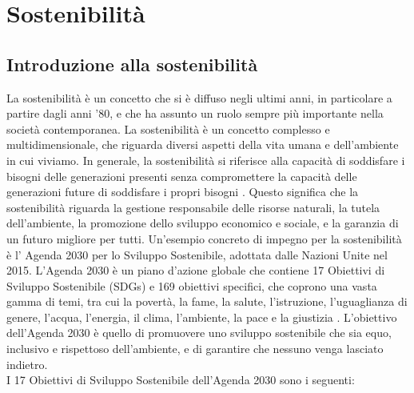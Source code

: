 \section{Sostenibilità}

\subsection{Introduzione alla sostenibilità}

La sostenibilità è un concetto che si è diffuso negli ultimi anni, in particolare a partire dagli anni '80, e che ha assunto un ruolo sempre più importante nella società contemporanea. La sostenibilità è un concetto complesso e multidimensionale, che riguarda diversi aspetti della vita umana e dell'ambiente in cui viviamo. In generale, la sostenibilità si riferisce alla capacità di soddisfare i bisogni delle generazioni presenti senza compromettere la capacità delle generazioni future di soddisfare i propri bisogni \cite{sostenibilità}. Questo significa che la sostenibilità riguarda la gestione responsabile delle risorse naturali, la tutela dell'ambiente, la promozione dello sviluppo economico e sociale, e la garanzia di un futuro migliore per tutti.
Un'esempio concreto di impegno per la sostenibilità è l' Agenda 2030 per lo Sviluppo Sostenibile, adottata dalle Nazioni Unite nel 2015. L'Agenda 2030 è un piano d'azione globale che contiene 17 Obiettivi di Sviluppo Sostenibile (SDGs) e 169 obiettivi specifici, che coprono una vasta gamma di temi, tra cui la povertà, la fame, la salute, l'istruzione, l'uguaglianza di genere, l'acqua, l'energia, il clima, l'ambiente, la pace e la giustizia \cite{2030}. L'obiettivo dell'Agenda 2030 è quello di promuovere uno sviluppo sostenibile che sia equo, inclusivo e rispettoso dell'ambiente, e di garantire che nessuno venga lasciato indietro.\\
I 17 Obiettivi di Sviluppo Sostenibile dell'Agenda 2030 sono i seguenti:
